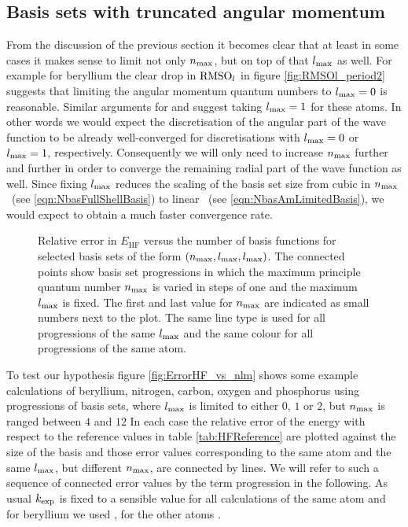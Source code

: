 \subsection{Basis sets with truncated angular momentum}
From the discussion of the previous section
it becomes clear that at least in some cases it makes sense to
limit not only $n_\text{max}$, but on top of that $l_\text{max}$ as well.
For example for beryllium the clear drop in $\text{RMSO}_l$
in figure \ref{fig:RMSOl_period2} suggests that limiting the angular
momentum quantum numbers to $l_\text{max} = 0$ is reasonable.
Similar arguments for  and  suggest taking $l_\text{max} = 1$ for these atoms.
In other words we would expect the discretisation
of the angular part of the \HF wave function to be already well-converged
for \CS discretisations with $l_\text{max} = 0$ or $l_\text{max} = 1$, respectively.
Consequently we will only need to increase $n_\text{max}$ further and further
in order to converge the remaining radial part of the wave function as well.
Since fixing $l_\text{max}$ reduces the scaling of the basis set size
from cubic in $n_\text{max}$~(see \eqref{eqn:NbasFullShellBasis}) to linear%
~(see \eqref{eqn:NbasAmLimitedBasis}),
we would expect to obtain a much faster convergence rate.

\begin{figure}
	\centering
	\caption[
		Relative error in $E_\text{HF}$ versus the basis size
		for selected \CS discretisations
	]{
		Relative error in $E_\text{HF}$ versus the number of basis functions
		for selected \CS basis sets of the form $(n_\text{max}, l_\text{max}, l_\text{max})$.
		The connected points show basis set progressions
		in which the maximum principle quantum number 
		$n_\text{max}$ is varied in steps of one and the maximum $l_\text{max}$ is fixed.
		The first and last value for $n_\text{max}$ are indicated as small numbers
		next to the plot.
		The same line type is used for all progressions of the same $l_\text{max}$
		and the same colour for all progressions of the same atom.
	}
	\label{fig:ErrorHF_vs_nlm}
\end{figure}
To test our hypothesis figure \vref{fig:ErrorHF_vs_nlm} shows some
example calculations
of beryllium, nitrogen, carbon, oxygen and phosphorus
using progressions of \CS basis sets, where $l_\text{max}$ is limited
to either $0$, $1$ or $2$,
but $n_\text{max}$ is ranged between $4$ and $12$
In each case the relative error of the \HF energy
with respect to the reference values in table \ref{tab:HFReference}
are plotted against the size of the \CS basis
and those error values corresponding to the same atom and the same $l_\text{max}$,
but different $n_\text{max}$, are connected by lines.
We will refer to such a sequence of connected error values
by the term progression in the following.
As usual $k_\text{exp}$ is fixed to a sensible value for all calculations
of the same atom
and for beryllium we used \RHF, for the other atoms \UHF.

